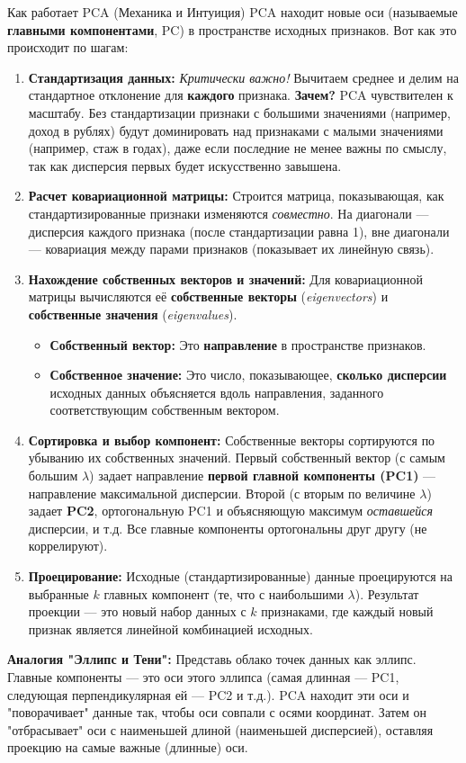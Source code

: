 \begin{textbox}{Как работает PCA (Механика и Интуиция)}
    PCA находит новые оси (называемые \textbf{главными компонентами}, PC) в пространстве исходных признаков. Вот как это происходит по шагам:
    \begin{enumerate}
        \item \textbf{Стандартизация данных:} \textit{Критически важно!} Вычитаем среднее и делим на стандартное отклонение для \textbf{каждого} признака. \textbf{Зачем?} PCA чувствителен к масштабу. Без стандартизации признаки с большими значениями (например, доход в рублях) будут доминировать над признаками с малыми значениями (например, стаж в годах), даже если последние не менее важны по смыслу, так как дисперсия первых будет искусственно завышена.
        \item \textbf{Расчет ковариационной матрицы:} Строится матрица, показывающая, как стандартизированные признаки изменяются \textit{совместно}. На диагонали — дисперсия каждого признака (после стандартизации равна 1), вне диагонали — ковариация между парами признаков (показывает их линейную связь).
        \item \textbf{Нахождение собственных векторов и значений:} Для ковариационной матрицы вычисляются её \textbf{собственные векторы} (\textit{eigenvectors}) и \textbf{собственные значения} (\textit{eigenvalues}).
            \begin{itemize}
                \item \textbf{Собственный вектор:} Это \textbf{направление} в пространстве признаков.
                \item \textbf{Собственное значение:} Это число, показывающее, \textbf{сколько дисперсии} исходных данных объясняется вдоль направления, заданного соответствующим собственным вектором.
            \end{itemize}
        \item \textbf{Сортировка и выбор компонент:} Собственные векторы сортируются по убыванию их собственных значений. Первый собственный вектор (с самым большим $\lambda$) задает направление \textbf{первой главной компоненты (PC1)} — направление максимальной дисперсии. Второй (с вторым по величине $\lambda$) задает \textbf{PC2}, ортогональную PC1 и объясняющую максимум \textit{оставшейся} дисперсии, и т.д. Все главные компоненты ортогональны друг другу (не коррелируют).
        \item \textbf{Проецирование:} Исходные (стандартизированные) данные проецируются на выбранные $k$ главных компонент (те, что с наибольшими $\lambda$). Результат проекции — это новый набор данных с $k$ признаками, где каждый новый признак является линейной комбинацией исходных.
    \end{enumerate}
    \textbf{Аналогия "Эллипс и Тени":} Представь облако точек данных как эллипс. Главные компоненты — это оси этого эллипса (самая длинная — PC1, следующая перпендикулярная ей — PC2 и т.д.). PCA находит эти оси и "поворачивает" данные так, чтобы оси совпали с осями координат. Затем он "отбрасывает" оси с наименьшей длиной (наименьшей дисперсией), оставляя проекцию на самые важные (длинные) оси.
\end{textbox}

